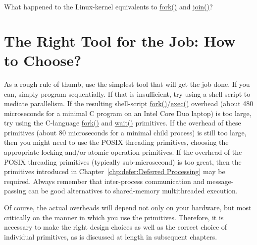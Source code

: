 \QuickQuiz{}
	What happened to the Linux-kernel equivalents to \url{fork()}
	and \url{join()}?
 \QuickQuizEnd

\section{The Right Tool for the Job: How to Choose?}
\label{sec:toolsoftrade:The Right Tool for the Job: How to Choose?}

As a rough rule of thumb, use the simplest tool that will get the job done.
If you can, simply program sequentially.
If that is insufficient, try using a shell script to mediate parallelism.
If the resulting shell-script \url{fork()}/\url{exec()} overhead
(about 480 microseconds for a minimal C program on an Intel Core Duo
laptop) is too
large, try using the C-language \url{fork()} and \url{wait()} primitives.
If the overhead of these primitives (about 80 microseconds for a minimal
child process) is still too large, then you
might need to use the POSIX threading primitives, choosing the appropriate
locking and/or atomic-operation primitives.
If the overhead of the POSIX threading primitives (typically sub-microsecond)
is too great, then the primitives introduced in
Chapter~\ref{chp:defer:Deferred Processing} may be required.
Always remember that inter-process communication and message-passing
can be good alternatives to shared-memory multithreaded execution.

Of course, the actual overheads will depend not only on your hardware,
but most critically on the manner in which you use the primitives.
Therefore, it is necessary to make the right design choices as well as
the correct choice of individual primitives,
as is discussed at length in subsequent chapters.
